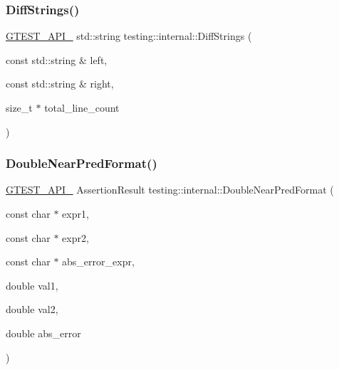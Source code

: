 \mbox{\label{namespacetesting_1_1internal_a513107ff8defa97d949937fc1350a56c}} 
\subsubsection{\texorpdfstring{Diff\+Strings()}{DiffStrings()}}
{\footnotesize\ttfamily \hyperlink{gtest-port_8h_aa73be6f0ba4a7456180a94904ce17790}{G\+T\+E\+S\+T\+\_\+\+A\+P\+I\+\_\+} std\+::string testing\+::internal\+::\+Diff\+Strings (\begin{DoxyParamCaption}\item[{const std\+::string \&}]{left,  }\item[{const std\+::string \&}]{right,  }\item[{size\+\_\+t $\ast$}]{total\+\_\+line\+\_\+count }\end{DoxyParamCaption})}

\mbox{\label{namespacetesting_1_1internal_aea60207c4cedc8946a70ada62e38da8f}} 
\subsubsection{\texorpdfstring{Double\+Near\+Pred\+Format()}{DoubleNearPredFormat()}}
{\footnotesize\ttfamily \hyperlink{gtest-port_8h_aa73be6f0ba4a7456180a94904ce17790}{G\+T\+E\+S\+T\+\_\+\+A\+P\+I\+\_\+} Assertion\+Result testing\+::internal\+::\+Double\+Near\+Pred\+Format (\begin{DoxyParamCaption}\item[{const char $\ast$}]{expr1,  }\item[{const char $\ast$}]{expr2,  }\item[{const char $\ast$}]{abs\+\_\+error\+\_\+expr,  }\item[{double}]{val1,  }\item[{double}]{val2,  }\item[{double}]{abs\+\_\+error }\end{DoxyParamCaption})}

\mbox{\label{namespacetesting_1_1internal_a1a1a1aed3fe00908b8a45d5ab4a33665}} 
